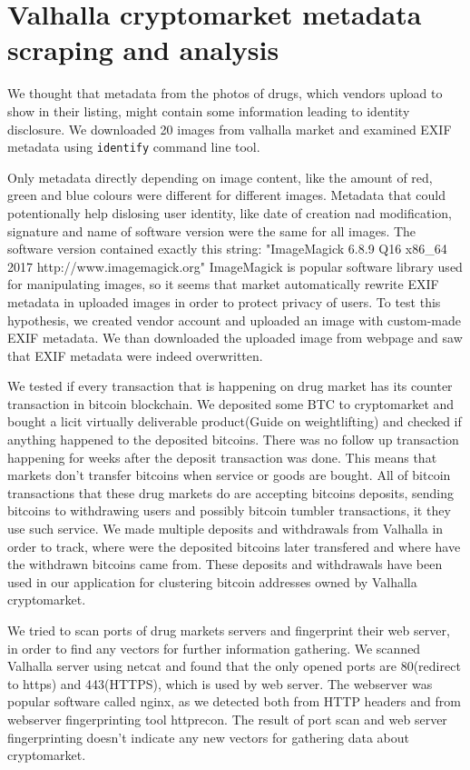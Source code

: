 \documentclass[
  digital, %
  table,   %
  lof,     %
  lot,     %
  oneside
]{fithesis3}
\begin{document}
\section{Valhalla cryptomarket metadata scraping and analysis}

We thought that metadata from the photos of drugs, which vendors upload
to show in their listing, might contain some information leading to identity disclosure.
We downloaded 20 images from valhalla market and examined 
EXIF metadata using \texttt{identify} command line tool.

Only metadata directly depending on image content, like the amount of red, green and blue colours
were different for different images.
Metadata that could potentionally help dislosing user identity,
like date of creation nad modification, signature and name of software version were the same for all images.
The software version contained exactly this string:
"ImageMagick 6.8.9 Q16 x86\_64 2017 http://www.imagemagick.org"
ImageMagick is popular software library used for manipulating images, so it seems
that market automatically rewrite EXIF metadata in uploaded images in order to protect privacy of users.
To test this hypothesis, we created vendor account and uploaded an image with
custom-made EXIF metadata. We than downloaded the uploaded image from webpage and 
saw that EXIF metadata were indeed overwritten.

We tested if every transaction that is happening on drug market has its counter transaction
in bitcoin blockchain.
We deposited some BTC to cryptomarket and bought a licit virtually deliverable
product(Guide on weightlifting) and checked if anything happened to the deposited bitcoins.
There was no follow up transaction happening for weeks after the deposit transaction was done.
This means that markets don't transfer bitcoins when service or goods are bought.
All of bitcoin transactions that these drug markets do 
are accepting bitcoins deposits,
sending bitcoins to withdrawing users and possibly bitcoin tumbler transactions, it they
use such service.
We made multiple deposits and withdrawals from Valhalla in order to track,
where were the deposited bitcoins later transfered and where have the withdrawn
bitcoins came from. These deposits and withdrawals have been
used in our application for clustering bitcoin addresses owned by Valhalla cryptomarket.

We tried to scan ports of drug markets servers and fingerprint their web server,
in order to find any vectors for further information gathering. 
We scanned Valhalla server using netcat and found that the only opened ports are 80(redirect to https) and 443(HTTPS),
which is used by web server. The webserver was popular software called nginx, as we detected
both from HTTP headers and from webserver fingerprinting tool httprecon.
The result of port scan and web server fingerprinting doesn't indicate
any new vectors for gathering data about cryptomarket.
\end{document}
